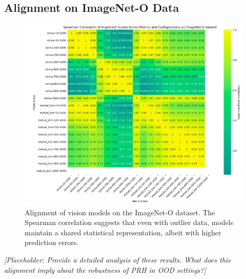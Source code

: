 \documentclass[10pt,a4paper]{article}
\begin{document}
\subsection{Alignment on ImageNet-O Data}
\begin{figure}[H]
    \centering
    \includegraphics[width=\textwidth]{prh_correlation_ood.jpg}
    \caption{Alignment of vision models on the ImageNet-O dataset. The Spearman correlation suggests that even with outlier data, models maintain a shared statistical representation, albeit with higher prediction errors.}
    \label{fig:prh_correlation_ood}
\end{figure}

\textit{[Placeholder: Provide a detailed analysis of these results. What does this alignment imply about the robustness of PRH in OOD settings?]}
\end{document}
